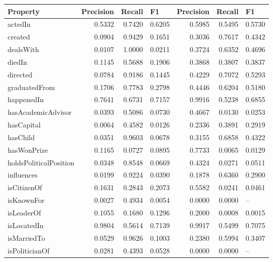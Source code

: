 \begin{table}[htbp]
\centering
\scriptsize
\begin{tabular}{|l|r|r|r|r|r|r|}
\hline
Property & \multicolumn{1}{l|}{Precision} & \multicolumn{1}{l|}{Recall} & \multicolumn{1}{l|}{F1} & \multicolumn{1}{l|}{Precision} & \multicolumn{1}{l|}{Recall} & \multicolumn{1}{l|}{F1} \\ \hline
actedIn & 0.5332 & 0.7420 & 0.6205 & 0.5985 & 0.5495 & 0.5730 \\ \hline
created & 0.0904 & 0.9429 & 0.1651 & 0.3036 & 0.7617 & 0.4342 \\ \hline
dealsWith & 0.0107 & 1.0000 & 0.0211 & 0.3724 & 0.6352 & 0.4696 \\ \hline
diedIn & 0.1145 & 0.5688 & 0.1906 & 0.3868 & 0.3807 & 0.3837 \\ \hline
directed & 0.0784 & 0.9186 & 0.1445 & 0.4229 & 0.7072 & 0.5293 \\ \hline
graduatedFrom & 0.1706 & 0.7783 & 0.2798 & 0.4446 & 0.6204 & 0.5180 \\ \hline
happenedIn & 0.7641 & 0.6731 & 0.7157 & 0.9916 & 0.5238 & 0.6855 \\ \hline
hasAcademicAdvisor & 0.0393 & 0.5086 & 0.0730 & 0.4667 & 0.0130 & 0.0253 \\ \hline
hasCapital & 0.0064 & 0.4582 & 0.0126 & 0.2336 & 0.3891 & 0.2919 \\ \hline
hasChild & 0.0351 & 0.9603 & 0.0678 & 0.3155 & 0.6858 & 0.4322 \\ \hline
hasWonPrize & 0.1165 & 0.0727 & 0.0895 & 0.7733 & 0.0065 & 0.0129 \\ \hline
holdsPoliticalPosition & 0.0348 & 0.8548 & 0.0669 & 0.4324 & 0.0271 & 0.0511 \\ \hline
influences & 0.0199 & 0.9224 & 0.0390 & 0.1878 & 0.6360 & 0.2900 \\ \hline
isCitizenOf & 0.1631 & 0.2843 & 0.2073 & 0.5582 & 0.0241 & 0.0461 \\ \hline
isKnownFor & 0.0027 & 0.4934 & 0.0054 & 0.0000 & 0.0000 & \multicolumn{1}{l|}{--} \\ \hline
isLeaderOf & 0.1055 & 0.1680 & 0.1296 & 0.2000 & 0.0008 & 0.0015 \\ \hline
isLocatedIn & 0.9804 & 0.5614 & 0.7139 & 0.9917 & 0.5499 & 0.7075 \\ \hline
isMarriedTo & 0.0529 & 0.9626 & 0.1003 & 0.2380 & 0.5994 & 0.3407 \\ \hline
isPoliticianOf & 0.0281 & 0.4393 & 0.0528 & 0.0000 & 0.0000 & \multicolumn{1}{l|}{--} \\ \hline

\end{tabular}
\end{table}

